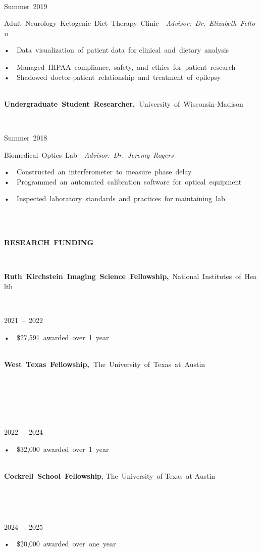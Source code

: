 \documentclass[
]{article}
\begin{document}
\textbf{~}

Summer~2019~

Adult~Neurology~Ketogenic~Diet~Therapy~Clinic~\textbar~\emph{Advisor:~Dr.~Elizabeth~Felton}~

•~~Data~visualization~of~patient data~for clinical~and~dietary~analysis~

•~~Managed~HIPAA~compliance,~safety,~and~ethics~for~patient~research~~\\
•~~Shadowed~doctor-patient~relationship~and~treatment~of~epilepsy~

~\\
\textbf{Undergraduate~Student~Researcher,~}University~of~Wisconsin-Madison\textbf{~~~}

\textbf{~}

Summer~2018~

Biomedical~Optics~Lab~\textbar~\emph{Advisor:~Dr.~Jeremy~Rogers}~

•~~Constructed~an~interferometer~to~measure~phase~delay~\\
•~~Programmed~an~automated~calibration~software~for~optical~equipment~

•~~Inspected~laboratory~standards~and~practices~for maintaining~lab~~

~\\
\strut ~\\
\textbf{RESEARCH~FUNDING~}

~

\textbf{Ruth~Kirchstein~Imaging~Science~Fellowship,}~National~Institutes~of~Health~

~

2021~--~2022~

•~~\$27,591~awarded~over~1~year~

\textbf{~\\
West~Texas~Fellowship,~}The~University~of~Texas~at~Austin\textbf{~}

\textbf{~}

\textbf{~}

\textbf{~}

2022~--~2024~

•~~\$32,000~awarded~over~1~year~

~\\
\textbf{Cockrell~School~Fellowship}, The~University~of Texas~at
Austin~~~

~

~

2024~--~2025~

•~~\$20,000~awarded~over~one~year~
\end{document}
